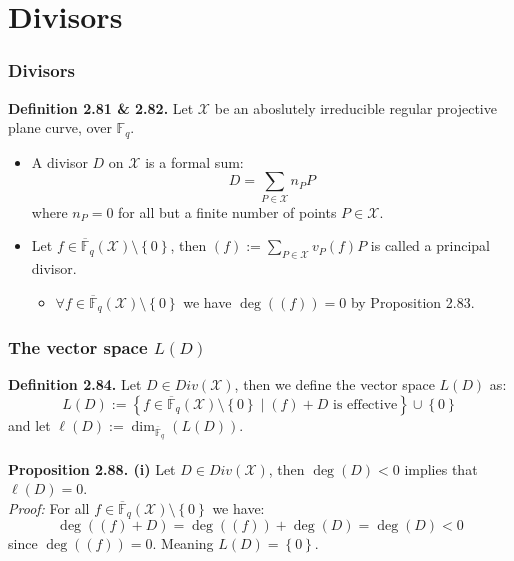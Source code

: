 \documentclass[10pt]{beamer}
\newcommand{\F}{\mathbb{F}}
\newcommand{\cF}{\overline{\F}}
\begin{document}
\section{Divisors}%
\label{sec:div}

\begin{frame}
  \frametitle{Divisors}
  \textbf{Definition 2.81 \& 2.82.} Let $\mathcal{X}$ be an aboslutely irreducible regular projective plane curve, over $\mathbb{F}_q$.
  \begin{itemize}
  \pause
  \item A divisor $D$ on $\mathcal{X}$ is a formal sum:
  \begin{equation*}
     D = \sum_{P \in \mathcal{X}} n_P P
  \end{equation*}
  where $n_P = 0$ for all but a finite number of points $P \in \mathcal{X}$.
  \pause
  \item Let $f \in \cF_{q}(\mathcal{X}) \setminus \left\{0\right\}$, then $(f) := \sum_{P \in \mathcal{X}} v_P(f)P$ is called a principal divisor.
  \pause
  \begin{itemize}
    \item $\forall f \in \cF_q(\mathcal{X}) \setminus \left\{0\right\}$ we have $\deg((f)) = 0$ by Proposition 2.83.
  \end{itemize}
  \end{itemize}


\end{frame}
\begin{frame}
  \frametitle{The vector space $L(D)$}
  \begin{itemize}

  \end{itemize}
  \textbf{Definition 2.84.} Let $D \in Div(\mathcal{X})$, then we define the vector space $L(D)$ as:
  \begin{equation*}
    L(D) := \left\{f \in \cF_{q}(\mathcal{X}) \setminus \left\{0\right\} \mid (f) + D \text{ is effective}\right\} \cup \left\{0\right\}
  \end{equation*}
  and let $\ell(D) := \dim_{\cF_q}(L(D))$. \\ \; \\

  \pause
  \textbf{Proposition 2.88. (i)} Let $D \in Div(\mathcal{X})$, then $\deg(D) < 0$ implies that $\ell(D) = 0$. \\
  \pause
  \textit{Proof:} For all $f \in \cF_q(\mathcal{X}) \setminus \left\{0\right\}$ we have:
  \begin{equation*}
    \deg((f) + D) = \deg((f)) + \deg(D) = \deg(D) < 0
  \end{equation*}
  since $\deg((f)) = 0$. \pause Meaning $L(D) = \left\{0\right\}$.

\end{frame}
\end{document}
